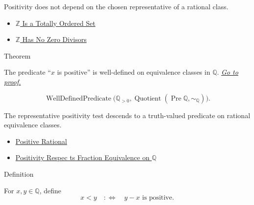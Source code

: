 \begin{remark*}[Interpretation]
Positivity does not depend on the chosen representative of a rational class.
\end{remark*}

\begin{dependencies}
\begin{itemize}
  \item \hyperref[thm:z-totally-ordered-set]{$\mathbb{Z}$ Is a Totally Ordered Set}
  \item \hyperref[thm:z-has-no-zero-divisors]{$\mathbb{Z}$ Has No Zero Divisors}
\end{itemize}
\end{dependencies}

\begin{theorembox}{Theorem}
\begin{theorem}
\label{thm:positivity-on-q-well-defined}
The predicate ``$x$ is positive'' is well-defined on equivalence classes in
$\mathbb{Q}$.
\hyperref[prf:positivity-on-q-well-defined]{\textit{Go to proof.}}
\end{theorem}
\end{theorembox}

\begin{remark*}
\[
\operatorname{WellDefinedPredicate}
\bigl(\mathbb{Q}_{>0},
\operatorname{Quotient}(\operatorname{Pre}\mathbb{Q},\sim_{\mathbb{Q}})\bigr).
\]
\end{remark*}

\begin{remark*}[Interpretation]
The representative positivity test descends to a truth-valued predicate on
rational equivalence classes.
\end{remark*}

\begin{dependencies}
\begin{itemize}
  \item \hyperref[def:positive-rational]{Positive Rational}
  \item \hyperref[lem:positivity-respects-equivalence-q]{Positivity Respec
ts Fraction Equivalence on $\mathbb{Q}$}
\end{itemize}
\end{dependencies}

\begin{definitionbox}{Definition}
\begin{definition}
\label{def:strict-order-on-q}
For $x,y\in\mathbb{Q}$, define
\[
x<y \quad:\Longleftrightarrow\quad y-x \text{ is positive}.
\]
\end{definition}
\end{definitionbox}

